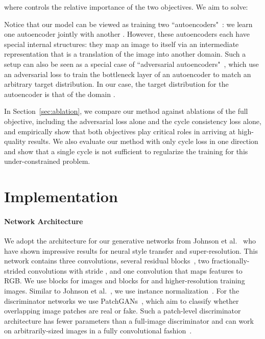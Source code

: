 \documentclass[10pt,twocolumn,letterpaper]{article}
\newcommand{\refsec}[1]{Section~\ref{sec:#1}}
\newcommand{\lblsec}[1]{\label{sec:#1}}
\newcommand{\shortcite}[1]{\cite{#1}}
\begin{document}
where  controls the relative importance of the two objectives. We aim to solve:


Notice that our model can be viewed as training two ``autoencoders"~\cite{hinton2006reducing}: we learn one autoencoder  jointly with another . However, these autoencoders each have special internal structures: they map an image to itself via an intermediate representation that is a translation of the image into another domain. Such a setup can also be seen as a special case of ``adversarial autoencoders"~\cite{makhzani2015adversarial}, which use an adversarial loss to train the bottleneck layer of an autoencoder to match an arbitrary target distribution. In our case, the target distribution for the  autoencoder is that of the domain .


In \refsec{ablation}, we compare our method against ablations of the full objective, including the adversarial loss  alone and the cycle consistency loss  alone, and empirically show that both objectives play critical roles in arriving at high-quality results. We also evaluate our method with only cycle loss in one direction and show that a single cycle is not sufficient to regularize the training for this under-constrained problem.
 \section{Implementation}
\lblsec{implementation}

\paragraph{Network Architecture}
We adopt the architecture for our generative networks from Johnson et al.~\shortcite{johnson2016perceptual} who have shown impressive results for neural style transfer and super-resolution. This network contains three convolutions, several residual blocks~\cite{he2016deep},  two fractionally-strided convolutions with stride ,  and one convolution that maps features to RGB. We use  blocks for  images and  blocks for  and higher-resolution training images. Similar to Johnson et al.~\shortcite{johnson2016perceptual}, we use instance normalization~\cite{ulyanov2016instance}. For the discriminator networks we use  PatchGANs~\cite{isola2016image,li2016precomputed,ledig2016photo}, which aim to classify whether  overlapping image patches are real or fake. Such a patch-level discriminator architecture has fewer parameters than a full-image discriminator and can work on arbitrarily-sized images in a fully convolutional fashion~\cite{isola2016image}. 
\end{document}
